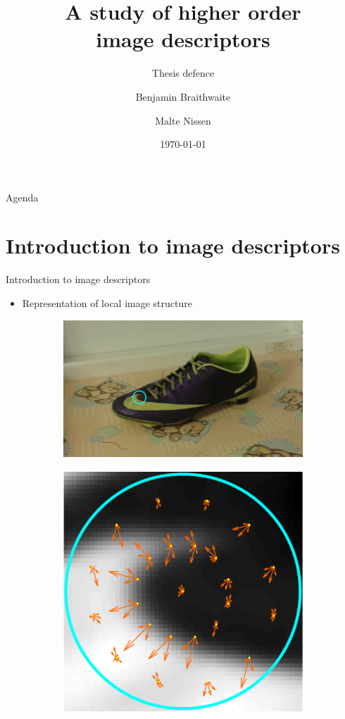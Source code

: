 \documentclass[14pt,t]{beamer}
\title{A study of higher order \\ image descriptors}
\subtitle{Thesis defence}
\author{Benjamin Braithwaite \\\and Malte Nissen}
\institute{Department of Computer Science}
\date[]{\today}
\begin{document}
%
\frame[plain]{\titlepage}
%
\begin{frame}{Agenda}
	\tableofcontents
\end{frame}
%
\section{Introduction to image descriptors}
%
\begin{frame}{Introduction to image descriptors}
\begin{itemize}
\item Representation of local image structure
\end{itemize}
\begin{figure}
\centering
	\begin{subfigure}[t]{0.58\textwidth}
		\includegraphics[width=\textwidth, clip=true, trim=165 50 155 68]{img/shoeDescriptor.pdf}
	\end{subfigure}
	\begin{subfigure}[t]{0.40\textwidth}
		\includegraphics[width=\textwidth, clip=true, trim=1 1 1 1]{img/shoeDescriptorZoom.pdf}
	\end{subfigure}
\end{figure}
\end{frame}
\end{document}
